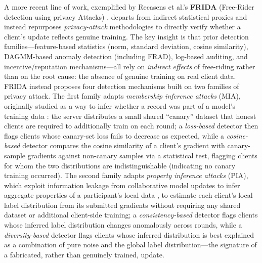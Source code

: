 A more recent line of work, exemplified by Recasens et al.'s \textbf{FRIDA} (Free-Rider detection using privacy Attacks) \cite{recasens2024frida}, departs from indirect statistical proxies and instead repurposes \emph{privacy-attack} methodologies to directly verify whether a client's update reflects genuine training. The key insight is that prior detection families—feature-based statistics (norm, standard deviation, cosine similarity), DAGMM-based anomaly detection (including FRAD), log-based auditing, and incentive/reputation mechanisms—all rely on \emph{indirect effects} of free-riding rather than on the root cause: the absence of genuine training on real client data. FRIDA instead proposes four detection mechanisms built on two families of privacy attack. The first family adapts \emph{membership inference attacks} (MIA), originally studied as a way to infer whether a record was part of a model's training data \cite{shokri2017membership}: the server distributes a small shared ``canary'' dataset that honest clients are required to additionally train on each round; a \emph{loss-based} detector then flags clients whose canary-set loss fails to decrease as expected, while a \emph{cosine-based} detector compares the cosine similarity of a client's gradient with canary-sample gradients against non-canary samples via a statistical test, flagging clients for whom the two distributions are indistinguishable (indicating no canary training occurred). The second family adapts \emph{property inference attacks} (PIA), which exploit information leakage from collaborative model updates to infer aggregate properties of a participant's local data \cite{melis2019exploiting}, to estimate each client's local label distribution from its submitted gradients without requiring any shared dataset or additional client-side training; a \emph{consistency-based} detector flags clients whose inferred label distribution changes anomalously across rounds, while a \emph{diversity-based} detector flags clients whose inferred distribution is best explained as a combination of pure noise and the global label distribution—the signature of a fabricated, rather than genuinely trained, update.

